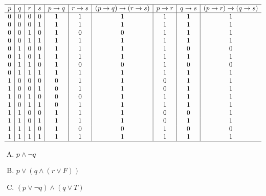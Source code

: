 {{        %
        \begin{practices}
            \begin{table}[H]
                \[
                    \begin{array}{c|c|c|c|c|c|c|c|c|c}
                        \hline
                        p & q & r & s & p \rightarrow q & r \rightarrow s & (p \rightarrow q) \rightarrow (r \rightarrow s) & p \rightarrow r & q \rightarrow s & (p \rightarrow r) \rightarrow (q \rightarrow s) \\
                        \hline
                        0 & 0 & 0 & 0 & 1 & 1 & 1 & 1 & 1 & 1 \\
                        0 & 0 & 0 & 1 & 1 & 1 & 1 & 1 & 1 & 1 \\
                        0 & 0 & 1 & 0 & 1 & 0 & 0 & 1 & 1 & 1 \\
                        0 & 0 & 1 & 1 & 1 & 1 & 1 & 1 & 1 & 1 \\
                        0 & 1 & 0 & 0 & 1 & 1 & 1 & 1 & 0 & 0 \\
                        0 & 1 & 0 & 1 & 1 & 1 & 1 & 1 & 1 & 1 \\
                        0 & 1 & 1 & 0 & 1 & 0 & 0 & 1 & 0 & 0 \\
                        0 & 1 & 1 & 1 & 1 & 1 & 1 & 1 & 1 & 1 \\
                        1 & 0 & 0 & 0 & 0 & 1 & 1 & 0 & 1 & 1 \\
                        1 & 0 & 0 & 1 & 0 & 1 & 1 & 0 & 1 & 1 \\
                        1 & 0 & 1 & 0 & 0 & 0 & 1 & 1 & 1 & 1 \\
                        1 & 0 & 1 & 1 & 0 & 1 & 1 & 1 & 1 & 1 \\
                        1 & 1 & 0 & 0 & 1 & 1 & 1 & 0 & 0 & 1 \\
                        1 & 1 & 0 & 1 & 1 & 1 & 1 & 0 & 1 & 1 \\
                        1 & 1 & 1 & 0 & 1 & 0 & 0 & 1 & 0 & 0 \\
                        1 & 1 & 1 & 1 & 1 & 1 & 1 & 1 & 1 & 1 \\
                        \hline
                   \end{array}
               \]
            \end{table}
        \end{practices}

        \begin{practices}
            \begin{enumerate}[A.]
                \item $p \wedge \neg q$
                \item $p \vee (q \wedge (r \vee F))$
                \item $(p \vee \neg q) \wedge (q \vee T)$
            \end{enumerate}
        \end{practices}

}}
